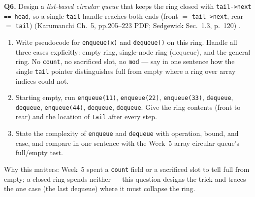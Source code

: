 \documentclass[11pt]{article}
\begin{document}
\textbf{Q6.} Design a \emph{list-based circular queue} that keeps the ring closed with \texttt{tail->next == head}, so a single \texttt{tail} handle reaches both ends (front $=$ \texttt{tail->next}, rear $=$ \texttt{tail}) (Karumanchi Ch.~5, pp.205--223 PDF; Sedgewick Sec.~1.3, p.~120) \cite{Karumanchi2017_data_structures_algorithms_made_easy,Sedgewick2011_algorithms}.
\begin{enumerate}
  \item[(a)] Write pseudocode for \texttt{enqueue(x)} and \texttt{dequeue()} on this ring. Handle all three cases explicitly: empty ring, single-node ring (dequeue), and the general ring. No \texttt{count}, no sacrificed slot, no \texttt{mod} --- say in one sentence how the single \texttt{tail} pointer distinguishes full from empty where a ring over array indices could not.
  \item[(b)] \sloppy Starting empty, run \texttt{enqueue(11)}, \texttt{enqueue(22)}, \texttt{enqueue(33)}, \texttt{dequeue}, \texttt{dequeue}, \texttt{enqueue(44)}, \texttt{dequeue}, \texttt{dequeue}. Give the ring contents (front to rear) and the location of \texttt{tail} after every step.
  \item[(c)] State the complexity of \texttt{enqueue} and \texttt{dequeue} with operation, bound, and case, and compare in one sentence with the Week~5 array circular queue's full/empty test.
\end{enumerate}
Why this matters: Week~5 spent a \texttt{count} field or a sacrificed slot to tell full from empty; a closed ring spends neither --- this question designs the trick and traces the one case (the last dequeue) where it must collapse the ring.



\end{document}
